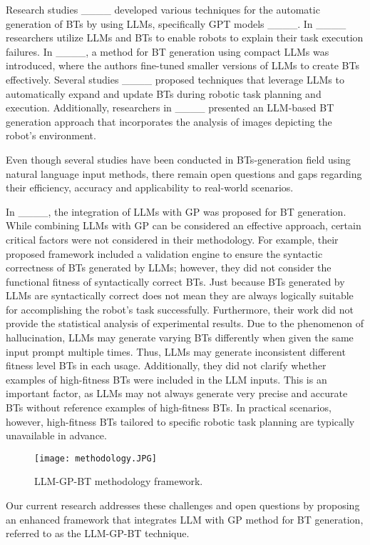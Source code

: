 Research studies ____ developed various techniques for the automatic generation of BTs by using LLMs, specifically GPT models ____. In ____ researchers utilize LLMs and BTs to enable robots to explain their task execution failures. In ____, a method for BT generation using compact LLMs was introduced, where the authors fine-tuned smaller versions of LLMs to create BTs effectively. Several studies ____ proposed techniques that leverage LLMs to automatically expand and update BTs during robotic task planning and execution. Additionally, researchers in ____ presented an LLM-based BT generation approach that incorporates the analysis of images depicting the robot's environment. 

Even though several studies have been conducted in BTs-generation field using natural language input methods, there remain open questions and gaps regarding their efficiency, accuracy and applicability to real-world scenarios. 

In ____, the integration of LLMs with GP was proposed for BT generation. While combining LLMs with GP can be considered an effective approach, certain critical factors were not considered in their methodology. For example, their proposed framework included a validation engine to ensure the syntactic correctness of BTs generated by LLMs; however, they did not consider the functional fitness of syntactically correct BTs. Just because BTs generated by LLMs are syntactically correct does not mean they are always logically suitable for accomplishing the robot's task successfully. Furthermore, their work did not provide the statistical analysis of experimental results. Due to the phenomenon of hallucination, LLMs may generate varying BTs differently when given the same input prompt multiple times. Thus, LLMs may generate inconsistent different fitness level BTs in each usage. Additionally, they did not clarify whether examples of high-fitness BTs were included in the LLM inputs. This is an important factor, as LLMs may not always generate very precise and accurate BTs without reference examples of high-fitness BTs. In practical scenarios, however, high-fitness BTs tailored to specific robotic task planning are typically unavailable in advance. 

\begin{figure*}[t]
    \centering
    \texttt{[image: methodology.JPG]} %
    \caption{LLM-GP-BT methodology framework.}
    \label{fig:example}
\end{figure*}

Our current research addresses these challenges and open questions by proposing an enhanced framework that integrates LLM with GP method for BT generation, referred to as the LLM-GP-BT technique.